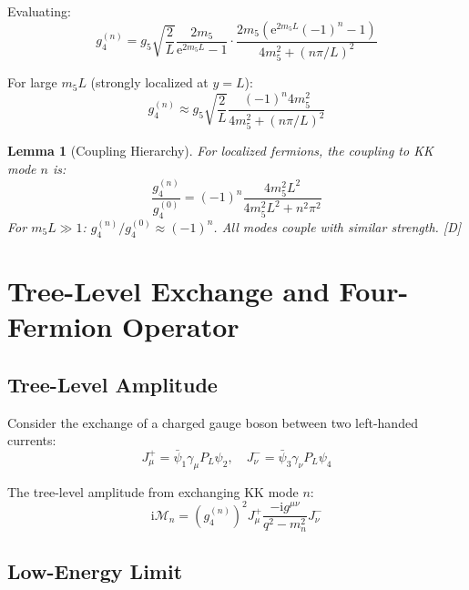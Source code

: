 \documentclass[11pt,a4paper]{article}
\newtheorem{lemma}[theorem]{Lemma}
\newcommand{\ii}{\mathrm{i}}
\newcommand{\ee}{\mathrm{e}}
\begin{document}
Evaluating:
\begin{equation}
g_4^{(n)} = g_5 \sqrt{\frac{2}{L}} \frac{2m_5}{\ee^{2m_5 L} - 1} \cdot
\frac{2m_5(\ee^{2m_5 L}(-1)^n - 1)}{4m_5^2 + (n\pi/L)^2}
\label{eq:g4-explicit}
\end{equation}

For large $m_5 L$ (strongly localized at $y = L$):
\begin{equation}
g_4^{(n)} \approx g_5 \sqrt{\frac{2}{L}} \frac{(-1)^n 4m_5^2}{4m_5^2 + (n\pi/L)^2}
\label{eq:g4-localized-approx}
\end{equation}

\begin{lemma}[Coupling Hierarchy]
\label{lem:coupling-hierarchy}
For localized fermions, the coupling to KK mode $n$ is:
\begin{equation}
\frac{g_4^{(n)}}{g_4^{(0)}} = (-1)^n \frac{4m_5^2 L^2}{4m_5^2 L^2 + n^2\pi^2}
\label{eq:coupling-ratio}
\end{equation}
For $m_5 L \gg 1$: $g_4^{(n)}/g_4^{(0)} \approx (-1)^n$. All modes couple with similar strength. [D]
\end{lemma}

\section{Tree-Level Exchange and Four-Fermion Operator}
\label{sec:four-fermion}

\subsection{Tree-Level Amplitude}

Consider the exchange of a charged gauge boson between two left-handed currents:
\begin{equation}
J_\mu^+ = \bar{\psi}_1 \gamma_\mu P_L \psi_2, \quad
J_\nu^- = \bar{\psi}_3 \gamma_\nu P_L \psi_4
\label{eq:currents}
\end{equation}

The tree-level amplitude from exchanging KK mode $n$:
\begin{equation}
\ii \mathcal{M}_n = (g_4^{(n)})^2 J_\mu^+ \frac{-\ii g^{\mu\nu}}{q^2 - m_n^2} J_\nu^-
\label{eq:amplitude-n}
\end{equation}

\subsection{Low-Energy Limit}
\end{document}
